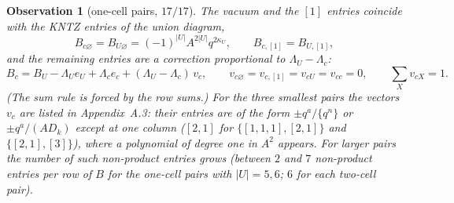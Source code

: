 \documentclass[11pt]{article}
\newtheorem{observation}{Observation}
\newcommand{\Lam}{\Lambda}
\newcommand{\vac}{\varnothing}
\begin{document}
\begin{observation}[one-cell pairs, $17/17$]\label{obs:one}
The vacuum and the $[1]$ entries coincide with the KNTZ entries of the union diagram,
\[
B_{c\vac}=B_{U\vac}=(-1)^{|U|}A^{2|U|}q^{2\kappa_U},\qquad B_{c,[1]}=B_{U,[1]},
\]
and the remaining entries are a correction proportional to $\Lam_U-\Lam_c$:
\begin{equation}\label{eq:corr}
B_c=B_U-\Lam_U e_U+\Lam_c e_c+(\Lam_U-\Lam_c)\,v_c,\qquad v_{c\vac}=v_{c,[1]}=v_{cU}=v_{cc}=0,\qquad \sum_X v_{cX}=1 .
\end{equation}
(The sum rule is forced by the row sums.)  For the three smallest pairs the vectors $v_c$ are listed in
Appendix~A.3: their entries are of the form $\pm q^a/\{q^n\}$ or $\pm q^a/(AD_k)$ except at one column
($[2,1]$ for $\{[1,1,1],[2,1]\}$ and $\{[2,1],[3]\}$), where a polynomial of degree one in $A^2$ appears.  For larger
pairs the number of such non-product entries grows (between $2$ and $7$ non-product entries per row of $B$ for the
one-cell pairs with $|U|=5,6$; $6$ for each two-cell pair).
\end{observation}
\end{document}
